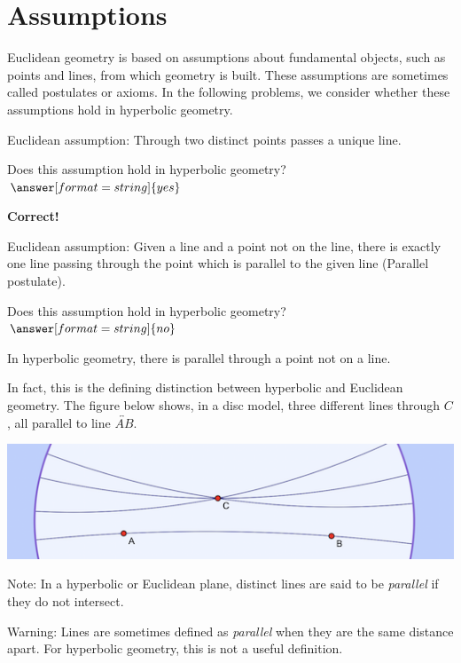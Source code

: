 \documentclass{ximera}
\begin{document}
\section*{Assumptions}
Euclidean geometry is based on assumptions about fundamental objects, such as points and lines, from which geometry is built. These assumptions are sometimes called postulates or axioms. In the following problems, we consider whether these assumptions hold in hyperbolic geometry. 


\begin{problem} %
Euclidean assumption: Through two distinct points passes a unique line.  

Does this assumption hold in hyperbolic geometry? 
$\answer[format=string]{yes}$

\begin{feedback}[correct]
\textbf{Correct!}   
\end{feedback}
\end{problem}

\begin{problem} %
Euclidean assumption: Given a line and a point not on the line, there is exactly one line passing through the point which is parallel to the given line (Parallel postulate).  

Does this assumption hold in hyperbolic geometry? 
$\answer[format=string]{no}$
\begin{problem}
In hyperbolic geometry, there is  parallel through a point not on a line. 
\begin{feedback}[correct]
In fact, this is the defining distinction between hyperbolic and Euclidean geometry.  The figure below shows, in a disc model, three different lines through $C$, all parallel to line $\overleftrightarrow{AB}$.  
\begin{center}
\includegraphics{hyperbolicParallels.png}
\end{center}
Note: In a hyperbolic or Euclidean plane, distinct lines are said to be \emph{parallel} if they do not intersect.  

{\color{red} Warning: Lines are sometimes defined as \emph{parallel} when they are the same distance apart.  For hyperbolic geometry, this is not a useful definition.}  
\end{feedback}
\end{problem}
\end{problem}
\end{document}
